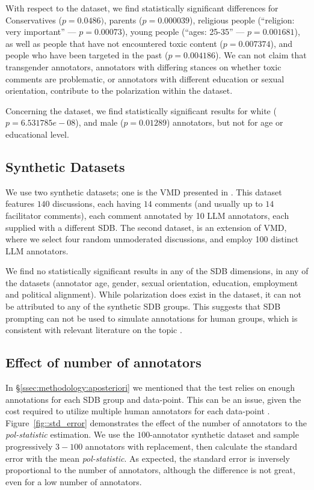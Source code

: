 \documentclass{article}
\begin{document}
With respect to the \textcite{kumar-et-al-2021} dataset, we find statistically significant differences for Conservatives ($p=0.0486)$, parents ($p=0.000039$), religious people (``religion: very important'' --- $p = 0.00073$), young people (``ages: 25-35'' --- $p = 0.001681$), as well as people that have not encountered toxic content ($p=0.007374$), and people who have been targeted in the past ($p=0.004186$). We can not claim that transgender annotators, annotators with differing stances on whether toxic comments are problematic, or annotators with different education or sexual orientation, contribute to the polarization within the dataset.

Concerning the \textcite{sap-etal-2022-annotators} dataset, we find statistically significant results for white ($p = 6.531785e-08$), and male ($p=0.01289$) annotators, but not for age or educational level.


\subsection{Synthetic Datasets}

We use two synthetic datasets; one is the \ac{VMD} presented in \textcite{tsirmpas2025scalableevaluationonlinefacilitation}. This dataset features $140$ discussions, each having $14$ comments (and usually up to $14$ facilitator comments), each comment annotated by 10 \ac{LLM} annotators, each supplied with a different \ac{SDB}. The second dataset, is an extension of \ac{VMD}, where we select four random unmoderated discussions, and employ 100 distinct \ac{LLM} annotators.

We find no statistically significant results in any of the \ac{SDB} dimensions, in any of the datasets (annotator age, gender, sexual orientation, education, employment and political alignment). While polarization does exist in the dataset, %
it can not be attributed to any of the synthetic \ac{SDB} groups. This suggests that \ac{SDB} prompting can not be used to simulate annotations for human groups, which is consistent with relevant literature on the topic \parencite{anthis_2025,hewitt2024predicting,rossi_2024,jansen_2023,bisbee_2023,neumann_2025}.


\subsection{Effect of number of annotators}
\label{ssec: results:num_annotators}

In \S\ref{ssec:methodology:aposteriori} we mentioned that the test relies on enough annotations for each \ac{SDB} group and data-point. This can be an issue, given the cost required to utilize multiple human annotators for each data-point \parencite{rossi_2024}. Figure~\ref{fig::std_error} demonstrates the effect of the number of annotators to the \textit{pol-statistic} estimation. We use the $100$-annotator synthetic dataset and sample progressively $3-100$ annotators with replacement, then calculate the standard error with the mean \textit{pol-statistic}. As expected, the standard error is inversely proportional to the number of annotators, although the difference is not great, even for a low number of annotators.
\end{document}
